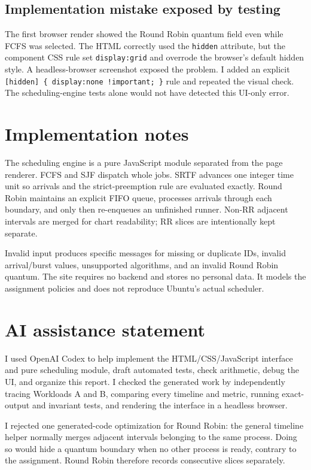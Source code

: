 \documentclass[11pt,a4paper]{article}
\begin{document}
\subsection{Implementation mistake exposed by testing}

The first browser render showed the Round Robin quantum field even while FCFS was
selected. The HTML correctly used the \texttt{hidden} attribute, but the component
CSS rule set \texttt{display:grid} and overrode the browser's default hidden style.
A headless-browser screenshot exposed the problem. I added an explicit
\texttt{[hidden] \{ display:none !important; \}} rule and repeated the visual check.
The scheduling-engine tests alone would not have detected this UI-only error.

\section{Implementation notes}

The scheduling engine is a pure JavaScript module separated from the page renderer.
FCFS and SJF dispatch whole jobs. SRTF advances one integer time unit so arrivals
and the strict-preemption rule are evaluated exactly. Round Robin maintains an
explicit FIFO queue, processes arrivals through each boundary, and only then
re-enqueues an unfinished runner. Non-RR adjacent intervals are merged for chart
readability; RR slices are intentionally kept separate.

Invalid input produces specific messages for missing or duplicate IDs, invalid
arrival/burst values, unsupported algorithms, and an invalid Round Robin quantum.
The site requires no backend and stores no personal data. It models the assignment
policies and does not reproduce Ubuntu's actual scheduler.

\section{AI assistance statement}

I used OpenAI Codex to help implement the HTML/CSS/JavaScript interface and pure
scheduling module, draft automated tests, check arithmetic, debug the UI, and
organize this report. I checked the generated work by independently tracing
Workloads A and B, comparing every timeline and metric, running exact-output and
invariant tests, and rendering the interface in a headless browser.

I rejected one generated-code optimization for Round Robin: the general timeline
helper normally merges adjacent intervals belonging to the same process. Doing so
would hide a quantum boundary when no other process is ready, contrary to the
assignment. Round Robin therefore records consecutive slices separately.
\end{document}
